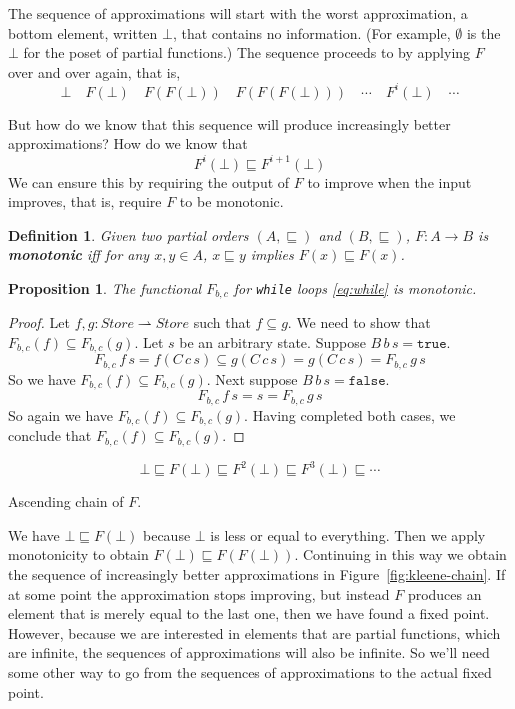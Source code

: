 \documentclass{tufte-handout}
\newcommand{\TRUE}[0]{\mathtt{true}}
\newcommand{\FALSE}[0]{\mathtt{false}}
\newtheorem{proposition}[theorem]{Proposition}
\newtheorem{definition}{Definition}%
\begin{document}
The sequence of approximations will start with the worst
approximation, a bottom element, written $\bot$, that contains no
information. (For example, $\emptyset$ is the $\bot$ for the poset of
partial functions.)
The sequence proceeds to by applying $F$ over and over again, that is,
\[
  \bot \quad F(\bot)\quad F(F(\bot))\quad F(F(F(\bot)))\quad \cdots\quad F^i(\bot)\quad \cdots
\]

But how do we know that this sequence will produce increasingly better
approximations?  How do we know that
\[
F^i(\bot) \sqsubseteq F^{i+1}(\bot)
\]
We can ensure this by requiring the output of $F$ to improve when the
input improves, that is, require $F$ to be monotonic.

\begin{definition}
  Given two partial orders $(A,\sqsubseteq)$ and
  $(B,\sqsubseteq)$, $F : A {\to} B$ is \textbf{\emph{monotonic}} iff
  for any $x,y\in A$, $x \sqsubseteq y$ implies $F(x) \sqsubseteq F(x)$.
\end{definition}

\begin{proposition}
  The functional $F_{b,c}$ for \texttt{while} loops \eqref{eq:while}
  is monotonic.
\end{proposition}
\begin{proof}
  Let $f, g : \mathit{Store} \rightharpoonup \mathit{Store}$ such that
  $f \subseteq g$. We need to show that $F_{b,c}(f) \subseteq
  F_{b,c}(g)$. 
  Let $s$ be an arbitrary state. Suppose $B\,b\,s = \TRUE$.
  \[
  F_{b,c}\,f\,s = f(C\,c\,s) \subseteq g(C\,c\,s) = g(C\,c\,s) = F_{b,c}\,g\,s 
  \]
  So we have $F_{b,c}(f) \subseteq F_{b,c}(g)$.
  Next suppose $B\,b\,s = \FALSE$.
  \[
  F_{b,c}\,f\,s = s
               = F_{b,c}\,g\,s 
  \]
  So again we have $F_{b,c}(f) \subseteq F_{b,c}(g)$.  Having
  completed both cases, we conclude that $F_{b,c}(f) \subseteq
  F_{b,c}(g)$.
\end{proof}


\begin{marginfigure}
\[
  \bot \sqsubseteq F(\bot) \sqsubseteq F^2(\bot) 
    \sqsubseteq F^3(\bot) \sqsubseteq \cdots
\]
\caption{Ascending chain of $F$.}
\label{fig:kleene-chain}
\end{marginfigure}
%
We have $\bot \sqsubseteq F(\bot)$ because $\bot$ is less or equal to
everything. Then we apply monotonicity to obtain $F(\bot) \sqsubseteq
F(F(\bot))$.  Continuing in this way we obtain the sequence of
increasingly better approximations in Figure~\ref{fig:kleene-chain}.
If at some point the approximation stops improving, but instead $F$
produces an element that is merely equal to the last one, then we have
found a fixed point. However, because we are interested in elements
that are partial functions, which are infinite, the sequences of
approximations will also be infinite. So we'll need some other way to
go from the sequences of approximations to the actual fixed point.
\end{document}
